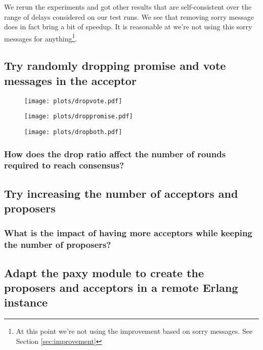 \documentclass[a4paper, 10pt]{article}
\begin{document}
We rerun the experiments and got other results that are self-consistent over the range of delays considered on our test runs. We see that removing sorry message does in fact bring a bit of speedup. It is reasonable at we're not using this sorry messages for anything\footnote{At this point we're not using the improvement based on sorry messages. See Section \ref{sec:improvement}}.



\subsection{Try randomly dropping promise and vote messages in the acceptor}

\begin{figure}[H]
  \centering
  \texttt{[image: plots/dropvote.pdf]}
    \caption{}
\end{figure} 

\begin{figure}[H]
  \centering
  \texttt{[image: plots/droppromise.pdf]}
    \caption{}
\end{figure} 

\begin{figure}[H]
  \centering
  \texttt{[image: plots/dropboth.pdf]}
    \caption{}
\end{figure} 

\subsubsection{How does the drop ratio affect the number of rounds required to reach consensus?}

\subsection{Try increasing the number of acceptors and proposers}

\subsubsection{What is the impact of having more acceptors while keeping the number of proposers?}

\subsection{Adapt the paxy module to create the proposers and acceptors in a remote Erlang instance}
\end{document}

